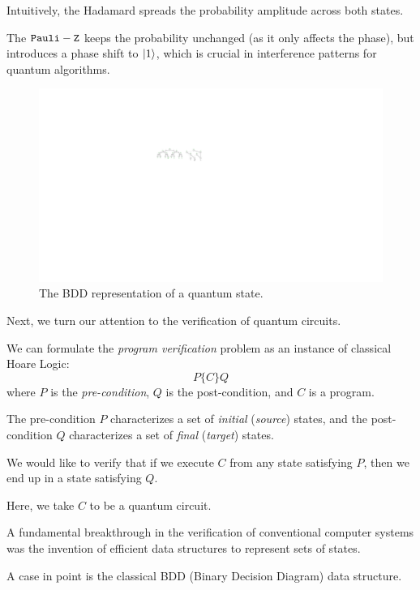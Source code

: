 Intuitively, the Hadamard spreads the probability amplitude across both states.

The $\mathtt{Pauli-Z}$ keeps the probability unchanged (as it only affects the phase), but introduces a phase shift to $|1\rangle$, which is crucial in interference patterns for quantum algorithms.


\begin{figure}[ht] 
    \centering
    \includegraphics[scale=1.2]{Figures/BDDs/BDDs} 
    \caption{The BDD representation of a quantum state.}
    \label{BDD:fig}
\end{figure}


Next, we turn our attention to the verification of quantum circuits.

We can formulate the {\it program verification} problem as an instance of classical Hoare Logic:
\[
P \{C\} Q
\]
where $P$ is the {\it pre-condition}, $Q$ is the post-condition, and $C$ is a program.

The pre-condition $P$ characterizes a set of {\it initial} ({\it source}) states, and the post-condition $Q$ characterizes a set of {\it final} ({\it target}) states.

We would like to verify that if we execute $C$ from any state satisfying $P$, then we end up in a state satisfying $Q$.

Here, we take $C$ to be a quantum circuit.

A fundamental breakthrough in the verification of conventional computer systems was the invention of efficient data structures to represent sets of states.


A case in point is the classical BDD (Binary Decision Diagram) data structure.

